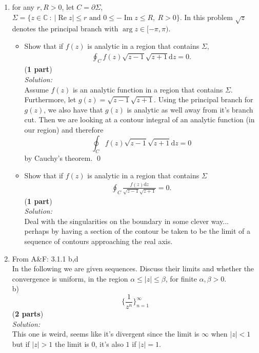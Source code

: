 \documentclass[10pt]{amsart}
\newcommand{\D}{\mathrm{d}}
\DeclareMathOperator{\real}{Re}
\DeclareMathOperator{\imag}{Im}
\theoremstyle{nonumberplain}
\begin{document}
\begin{enumerate}[label={\bf {\arabic*}:}]
\item for any $r, R > 0$, let $C = \partial \Sigma$, $\Sigma = \{z \in \mathbb C ~:~
      |\real z | \leq r \text{ and } 0 \leq -\imag z \leq R, ~ R >
    0\}$.   In this problem $\sqrt{z}$ denotes the principal branch
    with $\arg z  \in [-\pi, \pi)$.
    \begin{itemize}
    \item Show that if $f(z)$ is analytic in a region that contains $\Sigma$,
      \begin{align*}
        \oint_C f(z) \sqrt{z-1} \sqrt{z+1} \D z = 0.
      \end{align*}
(\textbf{1 part}) \\
\textit{Solution:} \\
Assume $f(z)$ is an analytic function in a region that contains $\Sigma$.
Furthermore, let $g(z) = \sqrt{z-1} \sqrt{z+1}$.
Using the principal branch for $g(z)$, we also have that $g(z)$ is analytic as well away from it's branch cut.
Then we are looking at a contour integral of an analytic function (in our region) and therefore
$$\oint_C f(z) \sqrt{z-1} \sqrt{z+1} \D z = 0$$
by Cauchy's theorem.
\qed \\

  \item Show that if $f(z)$ is analytic in a region that contains $\Sigma$
    \begin{align*}
        \oint_C \frac{f(z) \D z}{\sqrt{z-1} \sqrt{z+1}}= 0.
      \end{align*}
(\textbf{1 part}) \\
\textit{Solution:} \\
Deal with the singularities on the boundary in some clever way... \\
perhaps by having a section of the contour be taken to be the limit of a sequence of contours approaching the real axis.
\\
    \end{itemize}
\item From A\&F: 3.1.1 b,d \\
In the following we are given sequences.
Discuss their limits and whether the convergence is uniform, in the region $\alpha \leq |z| \leq \beta$, for finite $\alpha, \beta > 0$. \\
b) $$ \bigg\{ \frac 1 {z^n} \bigg\}_{n=1}^{\infty} $$
(\textbf{2 parts}) \\
\textit{Solution:}\\
This one is weird, seems like it's divergent since the limit is $\infty$ when $ |z| < 1$ but if $|z| > 1$ the limit is $0$, it's also $1$ if $|z| = 1$.
\\


\end{enumerate}
\end{document}
